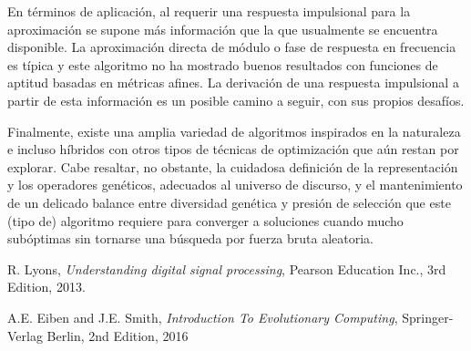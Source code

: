 \documentclass[11pt, journal]{IEEEtran}
\begin{document}
En términos de aplicación, al requerir una respuesta impulsional para la
aproximación se supone más información que la que usualmente se
encuentra disponible. La aproximación directa de módulo o fase de
respuesta en frecuencia es típica y este algoritmo no ha mostrado buenos
resultados con funciones de aptitud basadas en métricas afines. La
derivación de una respuesta impulsional a partir de esta información es
un posible camino a seguir, con sus propios desafíos.

Finalmente, existe una amplia variedad de algoritmos inspirados en la
naturaleza e incluso híbridos con otros tipos de técnicas de
optimización que aún restan por explorar. Cabe resaltar, no obstante, la
cuidadosa definición de la representación y los operadores genéticos,
adecuados al universo de discurso, y el mantenimiento de un delicado
balance entre diversidad genética y presión de selección que este (tipo
de) algoritmo requiere para converger a soluciones cuando mucho
subóptimas sin tornarse una búsqueda por fuerza bruta aleatoria.

\begin{thebibliography}{9}

  R. Lyons,
  \textit{Understanding digital signal processing},
  Pearson Education Inc.,
  3rd Edition,
  2013.

  A.E. Eiben and J.E. Smith,
  \textit{Introduction To Evolutionary Computing},
  Springer-Verlag Berlin,    
  2nd Edition,
  2016

\end{thebibliography}
\end{document}
